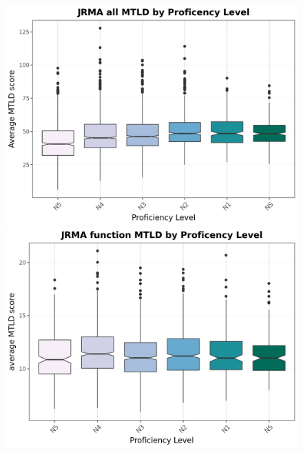 \begin{figure}[htbp]
    \centering
    \begin{minipage}{.48\textwidth}
        \centering
    \includegraphics[scale=.4]{img/JRMA-MTLD-all}
    \caption[MTLD all]{}
        \label{fig:MTLDall}
    \end{minipage}
    \hfill
\begin{minipage}{.48\textwidth}
        \centering
        \includegraphics[scale=.4]{img/JRMA-MTLDfunction}
        \caption[MTLD Function]{}
\label{fig:MTLDfunction}
\end{minipage}
    \end{figure}

